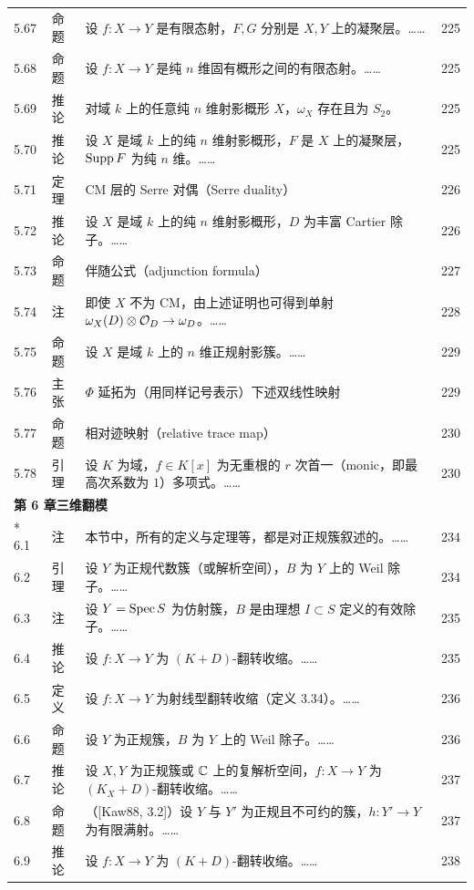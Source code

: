 \begin{longtable}{@{}p{}p{}p{}p{}@{}}
5.67 & 命题 & 设 $f\colon X\to Y$ 是有限态射，$F,G$ 分别是 $X,Y$ 上的凝聚层。…… & 225 \\
5.68 & 命题 & 设 $f\colon X\to Y$ 是纯 $n$ 维固有概形之间的有限态射。…… & 225 \\
5.69 & 推论 & 对域 $k$ 上的任意纯 $n$ 维射影概形 $X$，$\omega_X$ 存在且为 $S_2$。 & 225 \\
5.70 & 推论 & 设 $X$ 是域 $k$ 上的纯 $n$ 维射影概形，$F$ 是 $X$ 上的凝聚层，$\operatorname{Supp} F$ 为纯 $n$ 维。…… & 225 \\
5.71 & 定理 & CM 层的 Serre 对偶（Serre duality） & 226 \\
5.72 & 推论 & 设 $X$ 是域 $k$ 上的纯 $n$ 维射影概形，$D$ 为丰富 Cartier 除子。…… & 226 \\
5.73 & 命题 & 伴随公式（adjunction formula） & 227 \\
5.74 & 注 & 即使 $X$ 不为 CM，由上述证明也可得到单射 $\omega_X(D)\otimes\mathcal{O}_D\to\omega_D$。…… & 228 \\
5.75 & 命题 & 设 $X$ 是域 $k$ 上的 $n$ 维正规射影簇。…… & 229 \\
5.76 & 主张 & $\Phi$ 延拓为（用同样记号表示）下述双线性映射 & 229 \\
5.77 & 命题 & 相对迹映射（relative trace map） & 230 \\
5.78 & 引理 & 设 $K$ 为域，$f\in K[x]$ 为无重根的 $r$ 次首一（monic，即最高次系数为 $1$）多项式。…… & 230 \\
\multicolumn{4}{l}{\textbf{第 6 章\quad 三维翻模}}\\*
6.1 & 注 & 本节中，所有的定义与定理等，都是对正规簇叙述的。…… & 234 \\
6.2 & 引理 & 设 $Y$ 为正规代数簇（或解析空间），$B$ 为 $Y$ 上的 Weil 除子。…… & 234 \\
6.3 & 注 & 设 $Y=\operatorname{Spec} S$ 为仿射簇，$B$ 是由理想 $I\subset S$ 定义的有效除子。…… & 235 \\
6.4 & 推论 & 设 $f:X\to Y$ 为 $(K+D)$-翻转收缩。…… & 235 \\
6.5 & 定义 & 设 $f:X\to Y$ 为射线型翻转收缩（定义 3.34）。…… & 236 \\
6.6 & 命题 & 设 $Y$ 为正规簇，$B$ 为 $Y$ 上的 Weil 除子。…… & 236 \\
6.7 & 推论 & 设 $X,Y$ 为正规簇或 $\mathbb{C}$ 上的复解析空间，$f:X\to Y$ 为 $(K_X+D)$-翻转收缩。…… & 237 \\
6.8 & 命题 & （[Kaw88, 3.2]）设 $Y$ 与 $Y'$ 为正规且不可约的簇，$h:Y'\to Y$ 为有限满射。…… & 237 \\
6.9 & 推论 & 设 $f:X\to Y$ 为 $(K+D)$-翻转收缩。…… & 238 \\

\end{longtable}
